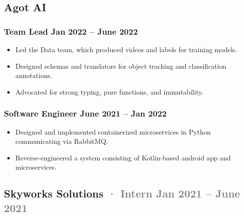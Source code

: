 \documentclass[12pt]{article} %
\providecommand{\tightlist}{%
  \setlength{\itemsep}{0pt}\setlength{\parskip}{0pt}}
\renewcommand{\emph}[1]{%
  \textcolor{gray}{#1}%
}
\begin{document}
\begin{paracol}{2}
\begin{raggedright}
\hypertarget{agot-ai}{%
\subsection{Agot AI}\label{agot-ai}}

\vspace{-5pt}

\hypertarget{team-lead-jan-2022-june-2022}{%
\subsubsection{\texorpdfstring{\small Team Lead \hfill Jan 2022 -- June
2022}{Team Lead Jan 2022 -- June 2022}}\label{team-lead-jan-2022-june-2022}}

\begin{itemize}
\tightlist
\item
  Led the Data team, which produced videos and labels for training
  models.
\item
  Designed schemas and translators for object tracking and
  classification annotations.
\item
  Advocated for strong typing, pure functions, and immutability.
\end{itemize}

\hypertarget{software-engineer-june-2021-jan-2022}{%
\subsubsection{\texorpdfstring{\small Software Engineer \hfill June 2021
-- Jan
2022}{Software Engineer June 2021 -- Jan 2022}}\label{software-engineer-june-2021-jan-2022}}

\begin{itemize}
\tightlist
\item
  Designed and implemented containerized microservices in Python
  communicating via RabbitMQ.
\item
  Reverse-engineered a system consisting of Kotlin-based android app and
  microservices.
\end{itemize}

\hypertarget{skyworks-solutions-intern-jan-2021-june-2021}{%
\subsection{\texorpdfstring{Skyworks Solutions \emph{· \small Intern
\hfill Jan 2021 -- June
2021}}{Skyworks Solutions · Intern Jan 2021 -- June 2021}}\label{skyworks-solutions-intern-jan-2021-june-2021}}


\end{raggedright}
\end{paracol}
\end{document}
